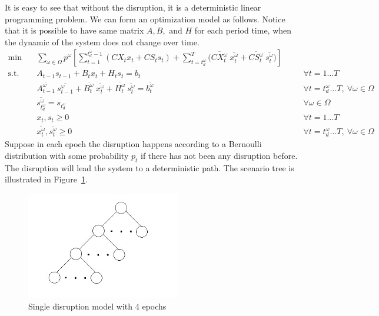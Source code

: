 \documentclass[11pt]{article}
\begin{document}
	\newline It is easy to see that without the disruption, it is a deterministic linear programming problem. We can form an optimization model as follows. Notice that it is possible to have same matrix \(A, B, \text{ and } H\) for each period time, when the dynamic of the system does not change over time.
	\begin{align}
		\min \quad & \sum_{\omega \in \Omega} p^\omega [\sum_{t = 1}^{t_d^\omega-1}{(CX_tx_t+CS_ts_t)}+\sum_{t = t_d^\omega}^{T}{(\overline{CX_t^\omega}\ \overline{x_t^\omega} + \overline{CS_t^\omega}\ \overline{s_t^\omega}}) ]\\
		\text{s.t.} \quad & A_{t-1}s_{t-1} + B_tx_{t} + H_ts_{t} = b_t & \quad & \forall t = 1 \dots T\\
		& \overline{A_{t-1}^\omega} \  \overline{s_{t-1}^\omega} + \overline{B_{t}^\omega}\ \overline{x_{t}^\omega} + \overline{H_{t}^\omega}\ \overline{s_{t}^\omega} = \overline{b_t^\omega}  & \quad & \forall t = t_d^\omega \dots T,\ \forall \omega \in \Omega\\
		& \overline{s_{t_d^\omega}^\omega} = s_{t_d^\omega}& \quad & \forall \omega \in \Omega\\
		& x_t, s_t \geq 0 & \quad & \forall t = 1 \dots T\\
		& \overline{x_t^\omega}, \overline{s_t^\omega} \geq 0 & \quad & \forall t = t_d^\omega \dots T,\ \forall \omega \in \Omega
	\end{align}
	Suppose in each epoch the disruption happens according to a Bernoulli distribution with some probability \(p_t\) if there has not been any disruption before. The disruption will lead the system to a deterministic path. The scenario tree is illustrated in Figure~\ref{scenarioTree}.
	\begin{figure}[H]
		\centering
		\includegraphics[width=0.6\textwidth]{single disruption model fig1}
		\caption{Single disruption model with 4 epochs}
		\label{scenarioTree}
	\end{figure}
	
\end{document}
